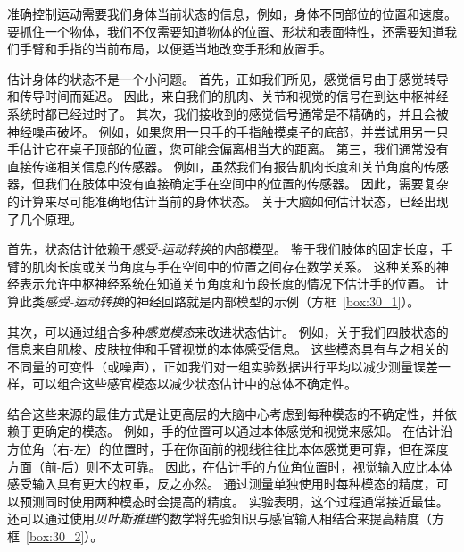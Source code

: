 准确控制运动需要我们身体当前状态的信息，例如，身体不同部位的位置和速度。
要抓住一个物体，我们不仅需要知道物体的位置、形状和表面特性，还需要知道我们手臂和手指的当前布局，以便适当地改变手形和放置手。


估计身体的状态不是一个小问题。
首先，正如我们所见，感觉信号由于感觉转导和传导时间而延迟。
因此，来自我们的肌肉、关节和视觉的信号在到达中枢神经系统时都已经过时了。
其次，我们接收到的感觉信号通常是不精确的，并且会被神经噪声破坏。
例如，如果您用一只手的手指触摸桌子的底部，并尝试用另一只手估计它在桌子顶部的位置，您可能会偏离相当大的距离。
第三，我们通常没有直接传递相关信息的传感器。
例如，虽然我们有报告肌肉长度和关节角度的传感器，但我们在肢体中没有直接确定手在空间中的位置的传感器。
因此，需要复杂的计算来尽可能准确地估计当前的身体状态。
关于大脑如何估计状态，已经出现了几个原理。


首先，状态估计依赖于\textit{感受-运动转换}的内部模型。
鉴于我们肢体的固定长度，手臂的肌肉长度或关节角度与手在空间中的位置之间存在数学关系。
这种关系的神经表示允许中枢神经系统在知道关节角度和节段长度的情况下估计手的位置。
计算此类\textit{感受-运动转换}的神经回路就是内部模型的示例（方框~\ref{box:30_1}）。


其次，可以通过组合多种\textit{感觉模态}来改进状态估计。
例如，关于我们四肢状态的信息来自肌梭、皮肤拉伸和手臂视觉的本体感受信息。
这些模态具有与之相关的不同量的可变性（或噪声），正如我们对一组实验数据进行平均以减少测量误差一样，可以组合这些感官模态以减少状态估计中的总体不确定性。


结合这些来源的最佳方式是让更高层的大脑中心考虑到每种模态的不确定性，并依赖于更确定的模态。
例如，手的位置可以通过本体感觉和视觉来感知。
在估计沿方位角（右-左）的位置时，手在你面前的视线往往比本体感觉更可靠，但在深度方面（前-后）则不太可靠。
因此，在估计手的方位角位置时，视觉输入应比本体感受输入具有更大的权重，反之亦然。
通过测量单独使用时每种模态的精度，可以预测同时使用两种模态时会提高的精度。
实验表明，这个过程通常接近最佳。
还可以通过使用\textit{贝叶斯推理}的数学将先验知识与感官输入相结合来提高精度（方框~\ref{box:30_2}）。


